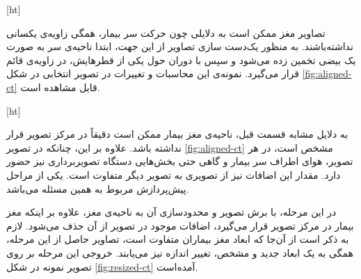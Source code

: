
[ht]
    
تصاویر مغز ممکن است به دلایلی چون حرکت سر بیمار، همگی زاویه‌ی یکسانی نداشته‌باشند.
به منظور یک‌دست سازی تصاویر از این جهت، ابتدا ناحیه‌ی سر به صورت یک بیضی تخمین زده می‌شود و سپس با دوران حول یکی از قطر‌هایش، در زاویه‌ی قائم قرار می‌گیرد.
نمونه‌ی این محاسبات و تغییرات در تصویر انتخابی در شکل \ref{fig:aligned-ct}
قابل مشاهده است.


[ht]

به دلایل مشابه قسمت قبل، ناحیه‌ی مغز بیمار ممکن است دقیقاً در مرکز تصویر قرار نداشته باشد.
علاوه بر این، چنانکه در تصویر \ref{fig:aligned-ct} مشخص است، 
در هر تصویر، هوای اطراف سر بیمار و گاهی حتی بخش‌هایی دستگاه تصویربرداری نیز حضور دارد.
مقدار این اضافات نیز از تصویری به تصویر دیگر متفاوت است.
یکی از مراحل پیش‌پردازش مربوط به همین مسئله می‌باشد.

در این مرحله،
با برش تصویر و محدودسازی آن به ناحیه‌ی مغز،
علاوه بر اینکه مغز بیمار در مرکز تصویر قرار می‌گیرد، اضافات موجود در تصویر از آن حذف می‌شود.
لازم به ذکر است از آن‌جا که ابعاد مغز بیماران متفاوت است، تصاویر حاصل از این مرحله، همگی به یک ابعاد جدید و مشخص، تغییر اندازه نیز می‌یابند.
خروجی این مرحله بر روی تصویر نمونه در شکل 
\ref{fig:resized-ct}
آمده‌است.

